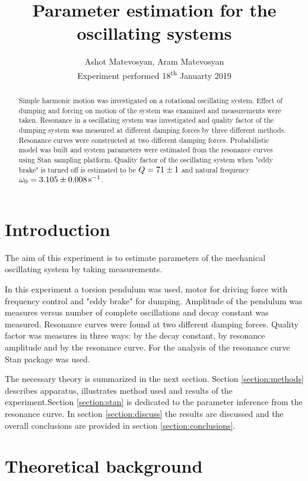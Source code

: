 \documentclass[12pt,a4paper]{article}
\author{
    Ashot Matevosyan, Aram Matevosyan \\ Experiment performed \dayofweekname{18}{01}{2019} 18\textsuperscript{th} Januarty 2019
}
\title{Parameter estimation for the oscillating systems}
\begin{document}
\maketitle
\begin{abstract}
\noindent 
	
	
\noindent Simple harmonic motion was investigated on a rotational oscillating system. Effect of dumping and forcing on motion of the system was examined and measurements were taken. Resonance in a oscillating system was investigated and quality factor of the dumping system was measured at different damping forces by three different methods.
Resonance curves were constructed at two different damping forces. Probabilistic model was built and system parameters were estimated from the resonance curves using Stan sampling platform. Quality factor of the oscillating system when "eddy brake" is turned off is estimated to be $Q = \num{71 \pm 1}$ and natural frequency $\omega_0 = \num{3.105 \pm 0.008}\, \si{\per\second}$.

\end{abstract}

\section{Introduction}
The aim of this experiment is to estimate parameters of the mechanical oscillating system by taking measurements.

In this experiment a torsion pendulum was used, motor for driving force with frequency control and "eddy brake"\cite{eddy-brake} for dumping.
Amplitude of the pendulum was measures versus number of complete oscillations and decay constant was measured. Resonance curves were found at two different damping forces. Quality factor was measures in three ways: by the decay constant, by resonance amplitude and by the resonance curve. For the analysis of the resonance curve Stan package\cite{stan} was used.

The necessary theory is summarized in the next section. Section \ref{section:methods} describes apparatus, illustrates method used and results of the experiment.Section \ref{section:stan} is dedicated to the parameter inference from the resonance curve. In section \ref{section:discuss} the results are discussed and the overall conclusions are provided in section \ref{section:conclusions}.
    
\section{Theoretical background}
\end{document}
